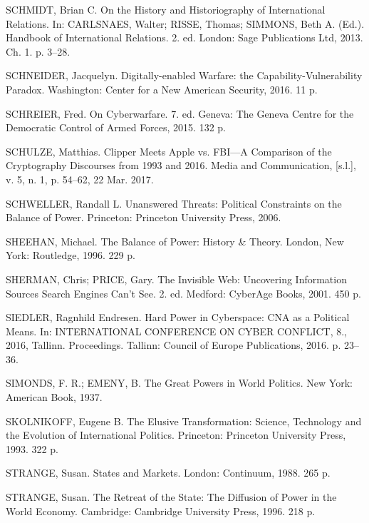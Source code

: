 \begin{list}{}{\setlength{\leftmargin}{0pt}\setlength{\itemsep}{6pt}\setlength{\parsep}{0pt}}
\item SCHMIDT, Brian C. On the History and Historiography of International Relations. In: CARLSNAES, Walter; RISSE, Thomas; SIMMONS, Beth A. (Ed.). Handbook of International Relations. 2. ed. London: Sage Publications Ltd, 2013. Ch. 1. p. 3--28.

\item SCHNEIDER, Jacquelyn. Digitally-enabled Warfare: the Capability-Vulnerability Paradox. Washington: Center for a New American Security, 2016. 11 p.

\item SCHREIER, Fred. On Cyberwarfare. 7. ed. Geneva: The Geneva Centre for the Democratic Control of Armed Forces, 2015. 132 p.

\item SCHULZE, Matthias. Clipper Meets Apple vs. FBI---A Comparison of the Cryptography Discourses from 1993 and 2016. Media and Communication, [s.l.], v. 5, n. 1, p. 54--62, 22 Mar. 2017.

\item SCHWELLER, Randall L. Unanswered Threats: Political Constraints on the Balance of Power. Princeton: Princeton University Press, 2006.

\item SHEEHAN, Michael. The Balance of Power: History \& Theory. London, New York: Routledge, 1996. 229 p.

\item SHERMAN, Chris; PRICE, Gary. The Invisible Web: Uncovering Information Sources Search Engines Can't See. 2. ed. Medford: CyberAge Books, 2001. 450 p.

\item SIEDLER, Ragnhild Endresen. Hard Power in Cyberspace: CNA as a Political Means. In: INTERNATIONAL CONFERENCE ON CYBER CONFLICT, 8., 2016, Tallinn. Proceedings. Tallinn: Council of Europe Publications, 2016. p. 23--36.

\item SIMONDS, F. R.; EMENY, B. The Great Powers in World Politics. New York: American Book, 1937.

\item SKOLNIKOFF, Eugene B. The Elusive Transformation: Science, Technology and the Evolution of International Politics. Princeton: Princeton University Press, 1993. 322 p.

\item STRANGE, Susan. States and Markets. London: Continuum, 1988. 265 p.

\item STRANGE, Susan. The Retreat of the State: The Diffusion of Power in the World Economy. Cambridge: Cambridge University Press, 1996. 218 p.


\end{list}
